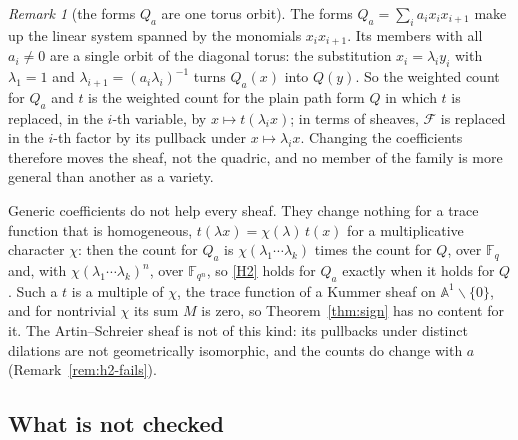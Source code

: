 \documentclass[11pt]{amsbook}
\theoremstyle{plain}
\theoremstyle{definition}
\theoremstyle{remark}
\newtheorem{remark}[theorem]{Remark}
\numberwithin{equation}{section}
\numberwithin{figure}{chapter}
\numberwithin{table}{chapter}
\newcommand{\F}{\mathbb{F}}
\newcommand{\cF}{\mathcal{F}}
\begin{document}
\begin{remark}[the forms $Q_a$ are one torus orbit]
\label{rem:torus-orbit}
The forms $Q_a=\sum_ia_ix_ix_{i+1}$ make up the linear system
spanned by the monomials $x_ix_{i+1}$. Its members with all
$a_i\ne0$ are a single orbit of the diagonal torus: the
substitution $x_i=\lambda_iy_i$ with $\lambda_1=1$ and
$\lambda_{i+1}=(a_i\lambda_i)^{-1}$ turns $Q_a(x)$ into $Q(y)$. So
the weighted count for $Q_a$ and $t$ is the weighted count for the
plain path form $Q$ in which $t$ is replaced, in the $i$-th
variable, by $x\mapsto t(\lambda_ix)$; in terms of sheaves, $\cF$ is
replaced in the $i$-th factor by its pullback under
$x\mapsto\lambda_ix$. Changing the coefficients therefore moves the
sheaf, not the quadric, and no member of the family is more
general than another as a variety.

Generic coefficients do not help every sheaf. They change nothing
for a trace function that is homogeneous, $t(\lambda x)=\chi(\lambda)\,t(x)$
for a
multiplicative character $\chi$: then the count for $Q_a$ is
$\chi(\lambda_1\cdots\lambda_k)$ times the count for $Q$, over
$\F_q$ and, with $\chi(\lambda_1\cdots\lambda_k)^n$, over
$\F_{q^n}$, so \ref{H2} holds for $Q_a$ exactly when it holds for
$Q$. Such a $t$ is a multiple of $\chi$, the trace function of a
Kummer sheaf on $\mathbb A^1\smallsetminus\{0\}$, and for
nontrivial $\chi$ its sum $M$ is zero, so
Theorem~\ref{thm:sign} has no content for it. The Artin--Schreier
sheaf is not of this kind: its pullbacks under distinct dilations
are not geometrically isomorphic, and the counts do change with
$a$ (Remark~\ref{rem:h2-fails}).
\end{remark}

\subsection{What is not checked}\label{subsec:not-checked}
\end{document}

